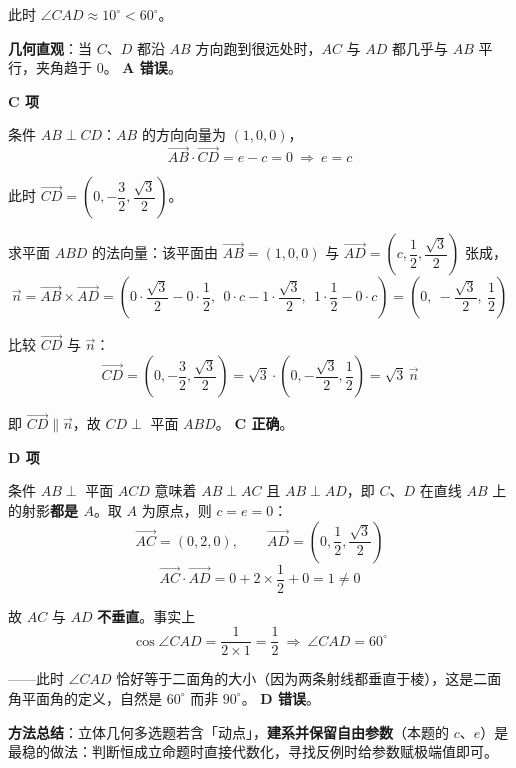 \begin{answer}
此时 $\angle CAD\approx 10^\circ<60^\circ$。

\textbf{几何直观}：当 $C$、$D$ 都沿 $AB$ 方向跑到很远处时，$AC$ 与 $AD$ 都几乎与 $AB$ 平行，夹角趋于 $0$。 \textbf{A 错误}。

\par\medskip

\textbf{C 项}

条件 $AB\perp CD$：$AB$ 的方向向量为 $(1,0,0)$，
\nopagebreak[4]
\[\overrightarrow{AB}\cdot\overrightarrow{CD}=e-c=0\ \Longrightarrow\ e=c\]

此时 $\overrightarrow{CD}=\left(0,-\dfrac32,\dfrac{\sqrt3}{2}\right)$。

求平面 $ABD$ 的法向量：该平面由 $\overrightarrow{AB}=(1,0,0)$ 与 $\overrightarrow{AD}=\left(c,\dfrac12,\dfrac{\sqrt3}{2}\right)$ 张成，
\nopagebreak[4]
\[\vec n=\overrightarrow{AB}\times\overrightarrow{AD}=\left(0\cdot\frac{\sqrt3}{2}-0\cdot\frac12,\ \ 0\cdot c-1\cdot\frac{\sqrt3}{2},\ \ 1\cdot\frac12-0\cdot c\right)=\left(0,\ -\frac{\sqrt3}{2},\ \frac12\right)\]

比较 $\overrightarrow{CD}$ 与 $\vec n$：
\nopagebreak[4]
\[\overrightarrow{CD}=\left(0,-\frac32,\frac{\sqrt3}{2}\right)=\sqrt3\cdot\left(0,-\frac{\sqrt3}{2},\frac12\right)=\sqrt3\,\vec n\]

即 $\overrightarrow{CD}\parallel\vec n$，故 $CD\perp$ 平面 $ABD$。 \textbf{C 正确}。

\par\medskip

\textbf{D 项}

条件 $AB\perp$ 平面 $ACD$ 意味着 $AB\perp AC$ 且 $AB\perp AD$，即 $C$、$D$ 在直线 $AB$ 上的射影\textbf{都是 $A$}。取 $A$ 为原点，则 $c=e=0$：
\nopagebreak[4]
\[\overrightarrow{AC}=(0,2,0),\qquad \overrightarrow{AD}=\left(0,\frac12,\frac{\sqrt3}{2}\right)\]
\nopagebreak[4]
\[\overrightarrow{AC}\cdot\overrightarrow{AD}=0+2\times\frac12+0=1\ne 0\]

故 $AC$ 与 $AD$ \textbf{不垂直}。事实上
\nopagebreak[4]
\[\cos\angle CAD=\frac{1}{2\times1}=\frac12\ \Longrightarrow\ \angle CAD=60^\circ\]

——此时 $\angle CAD$ 恰好等于二面角的大小（因为两条射线都垂直于棱），这是二面角平面角的定义，自然是 $60^\circ$ 而非 $90^\circ$。 \textbf{D 错误}。

\begin{gktip}
\textbf{方法总结}：立体几何多选题若含「动点」，\textbf{建系并保留自由参数}（本题的 $c$、$e$）是最稳的做法：判断恒成立命题时直接代数化，寻找反例时给参数赋极端值即可。
\end{gktip}


\par\medskip

\end{answer}
